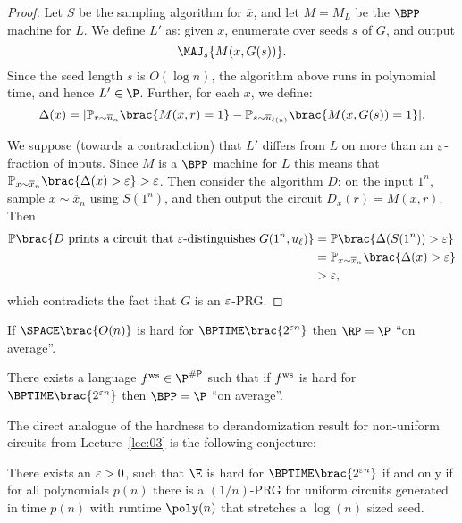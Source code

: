 \begin{proof}
	Let $S$ be the sampling algorithm for $\overline{x}$, and let $M = M_L$
	be the $\BPP$ machine for $L$. We define $L'$ as: given $x$, enumerate
	over seeds $s$ of $G$, and output
	\[ \MAJ_{s} \set{M(x, G(s)) }. \]
	Since the seed length $s$ is $O(\log n)$, the algorithm above runs in
	polynomial time, and hence $L' \in \P$.
	Further, for each $x$, we define:
	\[
		\Delta(x) = \card{
			\Pr_{r \sim \overline{u}_n}         \brac{ M(x, r) = 1}
                  - \Pr_{s \sim \overline{u}_{\ell(n)}} \brac{ M(x, G(s)) = 1}
		  }.
	\]

	We suppose (towards a contradiction) that $L'$ differs from $L$ on more
	than an $\varepsilon$-fraction of inputs. Since $M$ is a $\BPP$ machine for $L$
	this means that
	$\Pr_{x \sim \overline{x}_n}\brac{\Delta(x) > \eps} > \eps$. Then consider
	the algorithm $D$: on the input $1^n$, sample $x \sim \overline{x}_n$ using
	$S(1^n)$, and then output the circuit $D_x(r) = M(x, r)$.
	Then
  \begin{align*}
		\Pr\brac{D \text{ prints a circuit that } \eps \text{-distinguishes } G(1^n, u_{\ell})}
    &= \Pr\brac{\Delta(S(1^n)) > \eps}\\
    &= \Pr_{x \sim \overline{x}_n}\brac{\Delta(x) > \eps}\\
    &> \eps,
  \end{align*}
	which contradicts the fact that $G$ is an $\varepsilon$-PRG.
\end{proof}


\begin{theorem}
	If
	$\SPACE\brac{O(n)}$ is hard for $\BPTIME\brac{2^{\eps n}}$
	then
	$\RP = \P$ ``on average''.
\end{theorem}


\begin{theorem}
	There exists a language $\fws \in \P^{\sharpp}$ such that if $ f^{\text{ws}} $
	is hard for $\BPTIME\brac{2^{\eps n}}$ then
	$\BPP = \P$ ``on average''.
\end{theorem}

The direct analogue of the hardness to derandomization result for non-uniform
circuits from Lecture~\ref{lec:03} is the following conjecture:

\begin{conjecture}
	There exists an $\varepsilon > 0$, such that $\E$ is hard for
	$\BPTIME\brac{2^{\eps n}}$ if and only if for all polynomials $p(n)$ there
	is a $(1 / n)$-PRG for uniform circuits generated in time $p(n)$ with
	runtime $\poly(n)$ that stretches a $\log(n)$ sized seed.
\end{conjecture}

